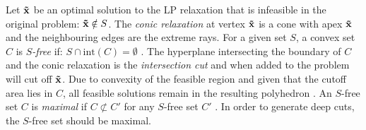 Let $\bold{\tilde x}$ be an optimal solution to the LP relaxation that is infeasible in the original problem: $\bold{\tilde x} \notin S$. %
The \textit{conic relaxation} at vertex $\bold{\tilde x}$ is a cone with apex $\bold{\tilde x}$ and the neighbouring edges are the extreme rays. For a given set $S$, a convex set $C$ is \textit{$S$-free} if: $S \cap \text{int}(C) = \emptyset$ \cite{bienstock_outer_product_free_sets}. 
The hyperplane intersecting the boundary of $C$ and the conic relaxation is the \textit{intersection cut} and when added to the problem will cut off $\bold{\tilde x}$. Due to convexity of the feasible region and given that the cutoff area lies in $C$, all feasible solutions remain in the resulting polyhedron %
\cite{musalem_intersection_cuts}.
An $S$-free set $C$ is \textit{maximal} if $C \not \subset C'$ for any $S$-free set $C'$ \cite{bienstock_outer_product_free_sets}. In order to generate deep cuts, the $S$-free set should be maximal. 

